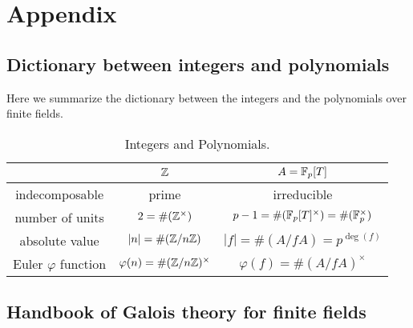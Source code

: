 \appendix
\section{Appendix}


\subsection{Dictionary between integers and polynomials}

Here we summarize the dictionary between the integers and the polynomials over finite fields.

\begin{table}[h]
    \begin{center}
        \begin{tabular}{c|c|c}
            \toprule
            & $\mathbb{Z}$ & $A = \mathbb{F}_p[T]$ \\
            \midrule
            indecomposable & prime & irreducible \\
            number of units &$2 = \#(\mathbb{Z}^\times)$ & $p - 1 = \# (\mathbb{F}_p[T]^\times) = \# (\mathbb{F}_p^\times)$ \\
            absolute value & $|n| = \# (\mathbb{Z} / n\mathbb{Z})$ & $|f| = \# (A / f A) = p^{\deg (f)}$ \\
            Euler $\varphi$ function & $\varphi(n) = \# (\mathbb{Z} / n \mathbb{Z})^\times$ & $\varphi(f) = \# (A / fA)^\times$ \\
            \bottomrule
        \end{tabular}
        \caption{Integers and Polynomials.}
        \label{tab:dictionary}
    \end{center}
\end{table}

\newpage

\subsection{Handbook of Galois theory for finite fields}
